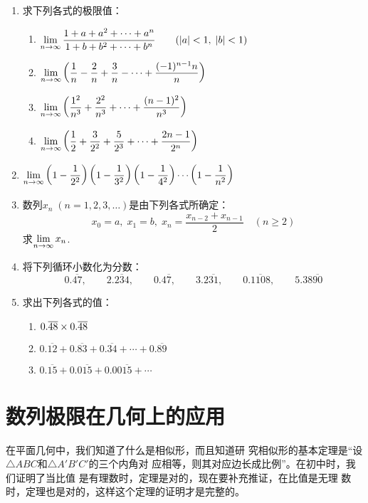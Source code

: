 \begin{enumerate}
\item 求下列各式的极限值：
\begin{enumerate}
    \item  $\displaystyle\lim _{n\to  \infty} \dfrac{1+a+a^{2}+\cdots+a^{n}}{1+b+b^{2}+\cdots+b^{n}} \qquad(|a|<1,\;|b|<1)$
    \item  $\displaystyle\lim _{n\to  \infty}\left(\dfrac{1}{n}-\dfrac{2}{n}+\dfrac{3}{n}-\cdots+\dfrac{(-1)^{n-1} n}{n}\right)$
    \item $\displaystyle\lim _{n\to  \infty}\left(\dfrac{1^{2}}{n^{3}}+\dfrac{2^{2}}{n^{3}}+\cdots+\dfrac{(n-1)^{2}}{n^{3}}\right)$
    \item $\displaystyle\lim _{n\to  \infty}\left(\dfrac{1}{2}+\dfrac{3}{{2^2}}+\dfrac{5}{2^3}+\cdots+\dfrac{2n-1}{2^{n}}\right)$
\end{enumerate}

\item $\displaystyle\lim _{n\to  \infty}\left(1-\dfrac{1}{2^2}\right)\left(1-\dfrac{1}{3^2}\right)\left(1-\dfrac{1}{4^2}\right)\cdots\left(1-\dfrac{1}{n^2}\right)$

\item 数列$x_n\; (n=1,2,3,\ldots)$是由下列各式所确定：
\[x_0=a,\; x_1=b,\; x_n=\frac{x_{n-2}+x_{n-1}}{2}\quad (n\ge 2)\]
求$\displaystyle\lim_{n\to\infty}x_n$.

\item 将下列循环小数化为分数：
\[0.\overline{47},\qquad 2.\overline{234},\qquad 0.4\overline{7},\qquad 3.2\overline{31},\qquad 0.\overline{1108},\qquad 5.38\overline{90}\]
\item 求出下列各式的值：
\begin{enumerate}
    \item $0.\overline{48}\times0.\overline{48}$
    \item $0.\overline{12}+0.\overline{83}+0.\overline{34}+\cdots+0.\overline{89}$
    \item $0.\overline{15}+0.0\overline{15}+0.00\overline{15}+\cdots$
\end{enumerate}
\end{enumerate}

\section{数列极限在几何上的应用}
在平面几何中，我们知道了什么是相似形，而且知道研
究相似形的基本定理是“设$\triangle ABC$和$\triangle A'B'C'$的三个内角对
应相等，则其对应边长成比例”。在初中时，我们证明了当比值
是有理数时，定理是对的，现在要补充推证，在比值是无理
数时，定理也是对的，这样这个定理的证明才是完整的。

